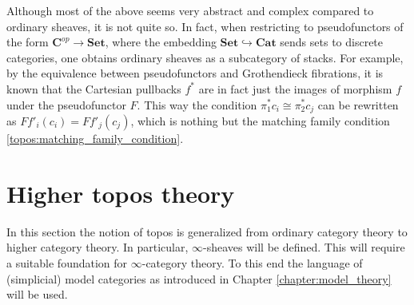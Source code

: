     \begin{remark}[1-sheaves]
        Although most of the above seems very abstract and complex compared to ordinary sheaves, it is not quite so. In fact, when restricting to pseudofunctors of the form $\mathbf{C}^{op}\rightarrow\mathbf{Set}$, where the embedding $\mathbf{Set}\hookrightarrow\mathbf{Cat}$ sends sets to discrete categories, one obtains ordinary sheaves as a subcategory of stacks. For example, by the equivalence between pseudofunctors and Grothendieck fibrations, it is known that the Cartesian pullbacks $f^*$ are in fact just the images of morphism $f$ under the pseudofunctor $F$. This way the condition $\pi_1^*c_i\cong\pi^*_2c_j$ can be rewritten as $Ff'_i(c_i)=Ff'_j(c_j)$, which is nothing but the matching family condition \eqref{topos:matching_family_condition}.
    \end{remark}

\section{Higher topos theory}

    In this section the notion of topos is generalized from ordinary category theory to higher category theory. In particular, $\infty$-sheaves will be defined. This will require a suitable foundation for $\infty$-category theory. To this end the language of (simplicial) model categories as introduced in Chapter \ref{chapter:model_theory} will be used.



